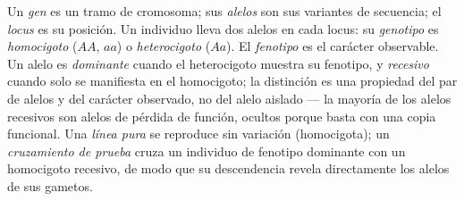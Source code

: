 \begin{definition}\label{def:b2:meiosis-heredity:vocabulary}
Un \emph{gen} es un tramo de cromosoma; sus \emph{alelos} son sus
variantes de secuencia; el \emph{locus} es su posición. Un individuo
 lleva dos alelos en cada locus: su \emph{genotipo}
es \emph{homocigoto} ($AA$, $aa$) o \emph{heterocigoto} ($Aa$).
El \emph{fenotipo} es el carácter observable. Un alelo es
\emph{dominante} cuando el heterocigoto muestra su fenotipo, y
\emph{recesivo} cuando solo se manifiesta en el homocigoto; la
distinción es una propiedad del par de alelos y del carácter observado,
no del alelo aislado --- la mayoría de los alelos recesivos son alelos
de pérdida de función, ocultos porque basta con una copia funcional. Una
\emph{línea pura} se reproduce sin variación (homocigota); un
\emph{cruzamiento de prueba} cruza un individuo de fenotipo dominante con
un homocigoto recesivo, de modo que su descendencia revela directamente
los alelos de sus gametos.
\end{definition}

